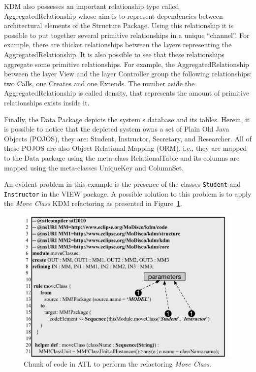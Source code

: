 KDM also possesses an important relationship type called AggregatedRelationship whose aim is to represent dependencies between architectural elements of the Structure Package. Using this relationship it is possible to put together several primitive relationships in a unique ``channel''. For example, there are thicker relationships between the layers representing the AggregatedRelationship. It is also possible to see that these relationships aggregate some primitive relationships. For example, the AggregatedRelationship between the layer View and the layer Controller group the following relationships: two Calls, one Creates and one Extends. The number aside the AggregatedRelationship is called density, that represents the amount of primitive relationships exists inside it.

Finally, the Data Package depicts the system s database and its tables. Herein, it is possible to notice that the depicted system owns a set of Plain Old Java Objects (POJOS), they are: Student, Instructor, Secretary, and Researcher. All of these POJOS are also Object Relational Mapping (ORM), i.e., they are mapped to the Data package using the meta-class RelationalTable and its columns are mapped using the meta-classes UniqueKey and ColumnSet.

An evident problem in this example is the presence of the classes \texttt{Student} and \texttt{Instructor} in the VIEW package. A possible solution to this problem is to apply the \textit{Move Class} KDM refactoring as presented in Figure~\ref{fig:ATLRefactoring}.

\begin{figure}[h]
	\centering
	\includegraphics[scale=0.516]{figuras/moveClassNewFormatted}
	\caption{Chunk of code in ATL to perform the refactoring \textit{Move Class}.}
	\label{fig:ATLRefactoring}
\end{figure}

